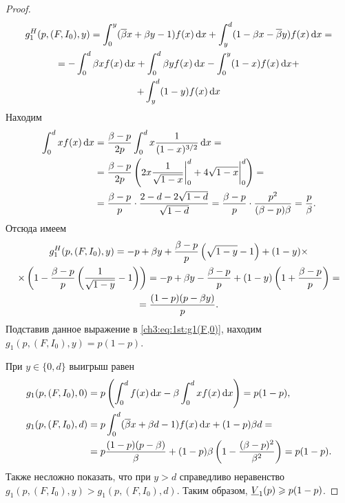 {\begin{proof}
  \begin{equation*}
    \begin{gathered}
    g^H_1(p, (F, I_0), y) 
    =
    \int_0^y ({{\overline{\beta}}} x + \beta y - 1) f(x) \mathop{}\!\mathrm{d} x +
    \int_y^d (1 - \beta x - {{\overline{\beta}}} y) f(x) \mathop{}\!\mathrm{d} x = \\
    =
    - \int_0^d \beta x f(x) \mathop{}\!\mathrm{d} x +
    \int_0^d \beta y f(x) \mathop{}\!\mathrm{d} x -
    \int_0^y (1-x) f(x) \mathop{}\!\mathrm{d} x + \\
    + \int_y^d (1-y) f(x) \mathop{}\!\mathrm{d} x
    \end{gathered}
  \end{equation*}
  Находим
  \begin{equation}
    \label{ch3:eq:1st:f-exp}
    \begin{aligned}
      \int_0^d x f(x) \mathop{}\!\mathrm{d} x 
      &= \frac{\beta - p}{2 p} \int_0^d x \frac{1}{(1-x)^{3/2}} \mathop{}\!\mathrm{d} x = \\
      &= \frac{\beta - p}{2 p} \left( 
        2x \frac{1}{\sqrt{1-x}} \bigg|_0^d +
        4 \sqrt{1-x} \bigg|_0^d
      \right) = \\
      &= \frac{\beta - p}{p} \cdot \frac{2 - d - 2\sqrt{1-d}}{\sqrt{1-d}} =
      \frac{\beta - p}{p} \cdot \frac{p^2}{(\beta - p) \beta} = \frac{p}{\beta}.
    \end{aligned}
  \end{equation}
  Отсюда имеем
  \begin{gather*}
    g^H_1(p, (F, I_0), y) 
    = -p + \beta y +
    \frac{\beta - p}{p} \left( \sqrt{1-y} - 1 \right) +
    (1-y) \times \\
    \times \left( 1 - \frac{\beta - p}{p} \left( \frac{1}{\sqrt{1-y}} - 1 \right) \right) =
    -p + \beta y - \frac{\beta - p}{p} + (1-y) \left( 1 + \frac{\beta - p}{p} \right) = \\
    = \frac{(1-p)(p - \beta y)}{p}.
  \end{gather*}
  Подставив данное выражение в \eqref{ch3:eq:1st:g1(F,0)}, находим $g_1(p, (F, I_0), y) = p (1-p)$.

  При $y \in \{0, d\}$ выигрыш равен
  \begin{align*}
    g_1(p, (F, I_0), 0) 
    &= p \left(\int_0^d f(x) \mathop{}\!\mathrm{d} x - \beta \int_0^d x f(x) \mathop{}\!\mathrm{d} x \right) =
      p(1-p),\\
    g_1(p, (F, I_0), d) 
    &=
      p \int_0^d ({{\overline{\beta}}} x + \beta d - 1) f(x) \mathop{}\!\mathrm{d} x + (1-p) \beta d = \\
    &= p \frac{(1-p)(p-\beta)}{\beta} +
      (1-p) \beta \left( 1 - \frac{(\beta - p)^2}{\beta^2} \right) = p(1-p).
  \end{align*}
  Также несложно показать, что при $y > d$ справедливо неравенство $g_1(p, (F,I_0), y) > g_1(p, (F, I_0), d)$.
  Таким образом, $\LV{1}(p) \geq p(1-p)$.
\end{proof}

}
